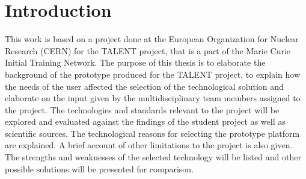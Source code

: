 \documentclass[english,12pt,a4paper,dvips]{article}
\begin{document}
\cleardoublepage
\storeinipagenumber
{}
\setcounter{page}{1}


\section{Introduction}

\thispagestyle{empty}

This work is based on a project done at the European Organization for Nuclear Research (CERN) for the TALENT project, that is a part of the Marie Curie Initial Training Network. The purpose of this thesis is to elaborate the background of the prototype produced for the TALENT project, to explain how the needs of the user affected the selection of the technological solution and elaborate on the input given by the multidisciplinary team members assigned to the project.
The technologies and standards relevant to the project will be explored and evaluated against the findings of the student project as well as scientific sources. The technological reasons for selecting the prototype platform are explained. A brief account of other limitations to the project is also given. The strengths and weaknesses of the selected technology will be listed and other possible solutions will be presented for comparison.


\clearpage

\end{document}
